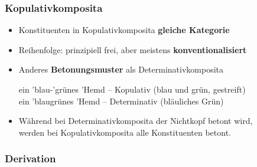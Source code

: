 \begin{frame}
\frametitle{Kopulativkomposita}

\begin{itemize}
	\item Konstituenten in Kopulativkomposita \ras \textbf{gleiche Kategorie}
	\item Reihenfolge: prinzipiell frei, aber meistens \textbf{konventionalisiert}
	\item Anderes \textbf{Betonungsmuster} als Determinativkomposita
	
	\eal 
        \ex ein 'blau-'grünes 'Hemd -- Kopulativ  (blau und grün, \zb gestreift)\\
	\ex ein 'blaugrünes 'Hemd -- Determinativ (bläuliches Grün)
	\zl
		 
	\item Während bei Determinativkomposita der Nichtkopf betont wird,\\
              werden bei Kopulativkomposita alle Konstituenten betont.
\end{itemize}


\end{frame}










\subsubsection{Derivation}




